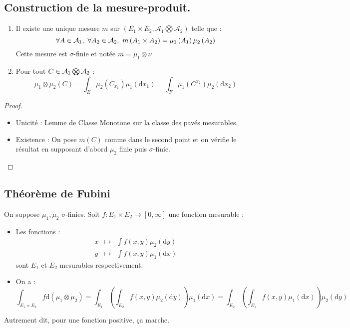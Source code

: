 \documentclass{cours}
\begin{document}
\subsection{Construction de la mesure-produit.}
\begin{theorem}
    \begin{enumerate}
        \item Il existe une unique mesure $m$ sur $\left(E_{1} \times E_{2}, \mathcal{A}_{1} \bigotimes \mathcal{A}_{2}\right)$ telle que :
              \[
                  \forall A \in \mathcal{A}_{1}, \ \forall A_{2} \in \mathcal{A}_{2}, \ m\left(A_{1} \times A_{2}\right) = \mu_{1}\left(A_{1}\right)\mu_{2}\left(A_{2}\right)
              \]
              Cette mesure est $\sigma$-finie et notée $m = \mu_{1} \otimes \nu$
        \item Pour tout $C \in \mathcal{A}_{1}\bigotimes\mathcal{A}_{2}$ :
              \[
                  \mu_{1} \otimes \mu_{2}\left(C\right) = \int_{E}\mu_{2}\left(C_{x_{1}}\right) \mu_{1}(\mathrm{d}x_{1}) = \int_{F} \mu_{1}\left(C^{x_{2}}\right)\mu_{2}\left(\mathrm{d}x_{2}\right)
              \]
    \end{enumerate}
\end{theorem}
\begin{proof}
    \begin{itemize}
        \item Unicité : Lemme de Classe Monotone sur la classe des pavés mesurables.
        \item Existence : On pose $m\left(C\right)$ comme dans le second point et on vérifie le résultat en supposant d'abord $\mu_{2}$ finie puis $\sigma$-finie.
    \end{itemize}
\end{proof}

\subsection{Théorème de Fubini}
\begin{theorem}
    On suppose $\mu_{1}, \mu_{2}$ $\sigma$-finies. Soit $f : E_{1} \times E_{2} \rightarrow \left[0, \infty\right]$ une fonction mesurable :
    \begin{itemize}
        \item Les fonctions :
              \[
                  \begin{aligned}
                      x & \mapsto & \int f(x, y) \mu_{2}(\mathrm{d}y) \\
                      y & \mapsto & \int f(x, y) \mu_{1}(\mathrm{d}x)
                  \end{aligned}
              \]
              sont $E_{1}$ et $E_{2}$ mesurables respectivement.
        \item On a :
              \[
                  \int_{E_{1} \times E_{2}} f \mathrm{d}(\mu_{1} \otimes \mu_{2}) = \int_{E_{1}}\left(\int_{E_{2}} f(x, y)\mu_{2}\left(\mathrm{d}y\right)\right)\mu_{1}\left(\mathrm{d}x\right) = \int_{E_{2}}\left(\int_{E_{1}} f(x, y)\mu_{1}\left(\mathrm{d}x\right)\right)\mu_{2}\left(\mathrm{d}y\right)
              \]
    \end{itemize}
\end{theorem}
Autrement dit, pour une fonction positive, ça marche.
\end{document}
